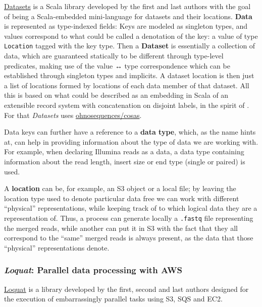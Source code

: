 \documentclass{frontiersSCNS} %
\begin{document}
\href{https://github.com/ohnosequences/datasets}{Datasets} is a Scala
library developed by the first and last authors with the goal of being a
Scala-embedded mini-language for datasets and their locations.
\textbf{Data} is represented as type-indexed fields: Keys are modeled as
singleton types, and values correspond to what could be called a
denotation of the key: a value of type \texttt{Location} tagged with the
key type. Then a \textbf{Dataset} is essentially a collection of data,
which are guaranteed statically to be different through type-level
predicates, making use of the value ↔ type correspondence which can be
established through singleton types and implicits. A dataset location is
then just a list of locations formed by locations of each data member of
that dataset. All this is based on what could be described as an
embedding in Scala of an extensible record system with concatenation on
disjoint labels, in the spirit of
\citep[\citet{harper1991record}]{harper1990extensible}. For that
\emph{Datasets} uses
\href{https://github.com/ohnosequences/cosas/}{ohnosequences/cosas}.

Data keys can further have a reference to a \textbf{data type}, which,
as the name hints at, can help in providing information about the type
of data we are working with. For example, when declaring Illumina reads
as a data, a data type containing information about the read length,
insert size or end type (single or paired) is used.

A \textbf{location} can be, for example, an S3 object or a local file;
by leaving the location type used to denote particular data free we can
work with different ``physical'' representations, while keeping track of
to which logical data they are a representation of. Thus, a process can
generate locally a \texttt{.fastq} file representing the merged reads,
while another can put it in S3 with the fact that they all correspond to
the ``same'' merged reads is always present, as the data that those
``physical'' representations denote.

\subsubsection{\texorpdfstring{\emph{Loquat}: Parallel data processing
with
AWS}{Loquat: Parallel data processing with AWS}}\label{loquat-parallel-data-processing-with-aws}

\href{https://github.com/ohnosequences/loquat}{Loquat} is a library
developed by the first, second and last authors designed for the
execution of embarrassingly parallel tasks using S3, SQS and EC2.
\end{document}
